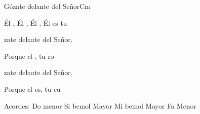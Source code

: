 \documentclass[12pt, spanish]{book}
\begin{document}
\begin{song}{Gózate delante del Señor}{Cm}
\begin{SBExtraKeys}
{            \begin{SBChorus}
                Él ,   Él ,   Él ,   Él es tu 
            \end{SBChorus}

            \begin{SBOpGroup}
                zate delante del Señor,

                Porque el , tu ro
            \end{SBOpGroup}

            \begin{SBOpGroup}
                zate delante del Señor,

                Porque el es, tu cu
            \end{SBOpGroup}

            \ifChordBk
            \begin{SBOpGroup}
                Acordes:\break
                \upchord{\Cm}Do menor \hfill
                \upchord{\Bflat}\qquad Si bemol Mayor \hfill\null\break
                \upchord{\Eflat}\qquad Mi bemol Mayor \hfill
                \upchord{\Fm}\qquad Fa Menor \hfill\null\break
            \end{SBOpGroup}
            \fi
        }\end{SBExtraKeys}
    \end{song}
\end{document}
